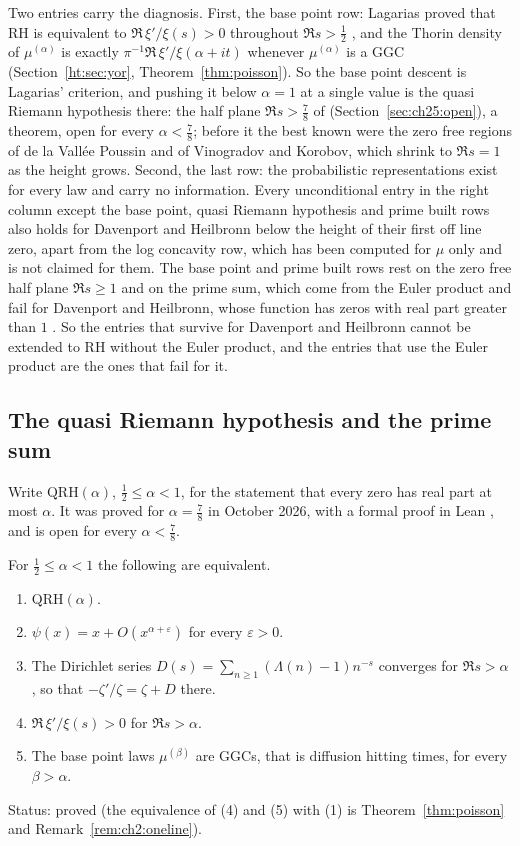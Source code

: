 Two entries carry the diagnosis. First, the base point row: Lagarias proved that RH is equivalent to $\Re\,\xi'/\xi(s)>0$ throughout $\Re s>\frac12$ \cite{Lagarias}, and the Thorin density of $\mu^{(\alpha)}$ is exactly $\pi^{-1}\Re\,\xi'/\xi(\alpha+it)$ whenever $\mu^{(\alpha)}$ is a GGC (Section~\ref{ht:sec:yor}, Theorem~\ref{thm:poisson}). So the base point descent is Lagarias' criterion, and pushing it below $\alpha=1$ at a single value is the quasi Riemann hypothesis there: the half plane $\Re s>\frac78$ of \cite{OAI26a} (Section~\ref{sec:ch25:open}), a theorem, open for every $\alpha<\frac78$; before it the best known were the zero free regions of de la Vall\'ee Poussin and of Vinogradov and Korobov, which shrink to $\Re s=1$ as the height grows. Second, the last row: the probabilistic representations exist for every law and carry no information. Every unconditional entry in the right column except the base point, quasi Riemann hypothesis and prime built rows also holds for Davenport and Heilbronn below the height of their first off line zero, apart from the log concavity row, which has been computed for $\mu$ only and is not claimed for them. The base point and prime built rows rest on the zero free half plane $\Re s\ge1$ and on the prime sum, which come from the Euler product and fail for Davenport and Heilbronn, whose function has zeros with real part greater than $1$ \cite{DH36}. %
So the entries that survive for Davenport and Heilbronn cannot be extended to RH without the Euler product, and the entries that use the Euler product are the ones that fail for it.

\subsection{The quasi Riemann hypothesis and the prime sum}
Write $\mathrm{QRH}(\alpha)$, $\frac12\le\alpha<1$, for the statement that every zero has real part at most $\alpha$. It was proved for $\alpha=\frac78$ in October 2026, with a formal proof in Lean \cite{OAI26a}, and is open for every $\alpha<\frac78$.

\begin{proposition}\label{ht:prop:qrh}
For $\frac12\le\alpha<1$ the following are equivalent.
\begin{enumerate}
\item $\mathrm{QRH}(\alpha)$.
\item $\psi(x)=x+O(x^{\alpha+\varepsilon})$ for every $\varepsilon>0$.
\item The Dirichlet series $D(s)=\sum_{n\ge1}(\Lambda(n)-1)n^{-s}$ converges for $\Re s>\alpha$, so that $-\zeta'/\zeta=\zeta+D$ there.
\item $\Re\,\xi'/\xi(s)>0$ for $\Re s>\alpha$.
\item The base point laws $\mu^{(\beta)}$ are GGCs, that is diffusion hitting times, for every $\beta>\alpha$.
\end{enumerate}
Status: proved (the equivalence of (4) and (5) with (1) is Theorem~\ref{thm:poisson} and Remark~\ref{rem:ch2:oneline}).
\end{proposition}

